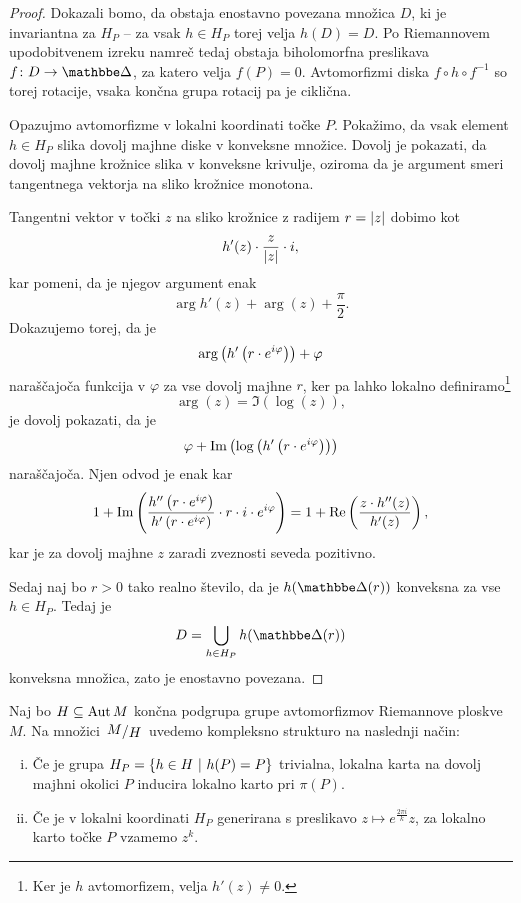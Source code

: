 \begin{proof}
Dokazali bomo, da obstaja enostavno povezana množica $D$, ki je
invariantna za $H_P$ -- za vsak $h \in H_P$ torej velja $h(D) = D$.
Po Riemannovem upodobitvenem izreku namreč tedaj obstaja
biholomorfna preslikava $f \colon D \to \dsk$, za katero velja
$f(P) = 0$. Avtomorfizmi diska $f \circ h \circ f^{-1}$ so torej
rotacije, vsaka končna grupa rotacij pa je ciklična.

Opazujmo avtomorfizme v lokalni koordinati točke $P$. Pokažimo, da
vsak element $h \in H_P$ slika dovolj majhne diske v konveksne
množice. Dovolj je pokazati, da dovolj majhne krožnice slika v
konveksne krivulje, oziroma da je argument smeri tangentnega
vektorja na sliko krožnice monotona.

Tangentni vektor v točki $z$ na sliko krožnice z radijem
$r = \left\lvert z\right\rvert$ dobimo kot
\[
h'(z) \cdot \frac{z}{\left\lvert z\right\rvert} \cdot i,
\]
kar pomeni, da je njegov argument enak
\[
\arg{h'(z)} + \arg(z) + \frac{\pi}{2}.
\]
Dokazujemo torej, da je
\[
\arg \left(h' \left(r \cdot e^{i \varphi}\right)\right) + \varphi
\]
naraščajoča funkcija v $\varphi$ za vse dovolj majhne $r$, ker pa
lahko lokalno definiramo\footnote{Ker je $h$ avtomorfizem, velja
$h'(z) \ne 0$.}
\[
\arg(z) = \Im(\log(z)),
\]
je dovolj pokazati, da je
\[
\varphi + \operatorname{Im} \left(\log \left(h' \left(r \cdot e^{i \varphi}\right)\right)\right)
\]
naraščajoča. Njen odvod je enak kar
\[
1 + \operatorname{Im} \left(\frac{h'' \left(r \cdot e^{i \varphi}\right)}
{h' \left(r \cdot e^{i \varphi}\right)} \cdot
r \cdot i \cdot e^{i \varphi}\right) =
1 + \operatorname{Re} \left(\frac{z \cdot h''(z)}{h'(z)}\right),
\]
kar je za dovolj majhne $z$ zaradi zveznosti seveda pozitivno.

Sedaj naj bo $r > 0$ tako realno število, da je
$h(\dsk(r))$ konveksna za vse $h \in H_P$. Tedaj je
\[
D = \bigcup_{h \in H_P} h(\dsk(r))
\]
konveksna množica, zato je enostavno povezana.
\end{proof}

\begin{definicija}
Naj bo $H \subseteq \operatorname{Aut} M$ končna podgrupa grupe avtomorfizmov
Riemannove ploskve $M$. Na množici $\kvoc{M}{H}$ uvedemo kompleksno
strukturo na naslednji način:

\begin{enumerate}[i)]
\item Če je grupa $H_P = \left\{h \in H~\middle\vert~h(P) = P\right\}$ trivialna,
lokalna karta na dovolj majhni okolici $P$ inducira lokalno karto
pri $\pi(P)$.
\item Če je v lokalni koordinati $H_P$ generirana s preslikavo
$z \mapsto e^{\frac{2 \pi i}{k}} z$, za lokalno karto točke $P$
vzamemo $z^k$.
\end{enumerate}
\end{definicija}

